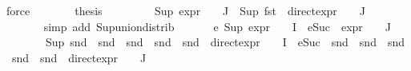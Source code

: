 \begin{isabellebody}
\ force\isanewline
\ \ \ \ \isamarkupfalse%
\ \isamarkupfalse%
\ {\isacharquery}{\kern0pt}thesis\ \isanewline
\ \ \ \ \ \ \isamarkupfalse%
\ {\isacartoucheopen}Sup\ {\isacharparenleft}{\kern0pt}{\isacharparenleft}{\kern0pt}expr{\isacharunderscore}{\kern0pt}{}\ {\isasymcirc}\ {\isasymPhi}{\isacharparenright}{\kern0pt}\ {\isacharbackquote}{\kern0pt}\ J\ {\isacharparenright}{\kern0pt}{\isacharequal}{\kern0pt}\ Sup\ {\isacharparenleft}{\kern0pt}{\isacharparenleft}{\kern0pt}fst\ {\isasymcirc}\ direct{\isacharunderscore}{\kern0pt}expr\ {\isasymcirc}\ {\isasymPhi}{\isacharparenright}{\kern0pt}\ {\isacharbackquote}{\kern0pt}\ J{\isacharparenright}{\kern0pt}{\isacartoucheclose}\ \isanewline
\ \ \ \ \ \ \isamarkupfalse%
\ {\isacharparenleft}{\kern0pt}simp\ add{\isacharcolon}{\kern0pt}\ Sup{\isacharunderscore}{\kern0pt}union{\isacharunderscore}{\kern0pt}distrib{\isacharparenright}{\kern0pt}\isanewline
\ \ \isamarkupfalse%
\isanewline
\isanewline
\ \ \isamarkupfalse%
\ e{}{\isacharcolon}{\kern0pt}\ {\isachardoublequoteopen}{\isacharparenleft}{\kern0pt}Sup\ {\isacharparenleft}{\kern0pt}{\isacharparenleft}{\kern0pt}expr{\isacharunderscore}{\kern0pt}{}\ {\isasymcirc}\ {\isasymPhi}{\isacharparenright}{\kern0pt}\ {\isacharbackquote}{\kern0pt}\ I\ {\isasymunion}\ {\isacharparenleft}{\kern0pt}{\isacharparenleft}{\kern0pt}eSuc\ {\isasymcirc}\ expr{\isacharunderscore}{\kern0pt}{}\ {\isasymcirc}\ {\isasymPhi}{\isacharparenright}{\kern0pt}\ {\isacharbackquote}{\kern0pt}\ J{\isacharparenright}{\kern0pt}{\isacharparenright}{\kern0pt}{\isacharparenright}{\kern0pt}\ {\isacharequal}{\kern0pt}\isanewline
\ \ \ \ \ \ \ \ {\isacharparenleft}{\kern0pt}Sup\ {\isacharparenleft}{\kern0pt}{\isacharparenleft}{\kern0pt}snd\ {\isasymcirc}\ snd\ {\isasymcirc}\ snd\ {\isasymcirc}\ snd\ {\isasymcirc}\ snd\ {\isasymcirc}\ direct{\isacharunderscore}{\kern0pt}expr\ {\isasymcirc}\ {\isasymPhi}{\isacharparenright}{\kern0pt}\ {\isacharbackquote}{\kern0pt}\ I\ {\isasymunion}\ {\isacharparenleft}{\kern0pt}{\isacharparenleft}{\kern0pt}eSuc\ {\isasymcirc}\ snd\ {\isasymcirc}\ snd\ {\isasymcirc}\ snd\ {\isasymcirc}\ snd\ {\isasymcirc}\ snd\ {\isasymcirc}\ direct{\isacharunderscore}{\kern0pt}expr\ {\isasymcirc}\ {\isasymPhi}{\isacharparenright}{\kern0pt}\ {\isacharbackquote}{\kern0pt}\ J{\isacharparenright}{\kern0pt}{\isacharparenright}{\kern0pt}{\isacharparenright}{\kern0pt}{\isachardoublequoteclose}\isanewline
\ \ \isamarkupfalse%
{\isacharminus}{\kern0pt}\isanewline

\end{isabellebody}

